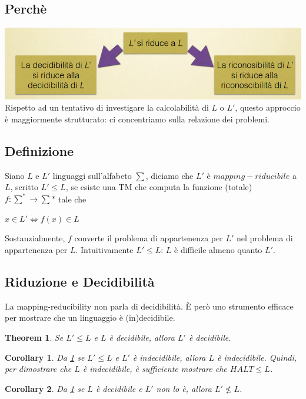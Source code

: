 \documentclass[a4paper, 12pt]{article}
\newtheorem{theorem}{Theorem}[section]
\newtheorem{corollary}{Corollary}[theorem]
\begin{document}
\subsection{Perch\`e}
\includegraphics[scale=0.5]{mapred1.png}\\
Rispetto ad un tentativo di investigare la calcolabilit\`a di $L$ o $L'$, questo approccio \`e maggiormente strutturato: ci concentriamo sulla relazione dei problemi.
\subsection{Definizione}
Siano $L$ e $L'$ linguaggi sull'alfabeto $\sum$, diciamo che $L'$ \`e $mapping-riducibile$ a $L$, scritto $L' \leq L$, se esiste una TM che computa la funzione (totale) $f: \sum^* \rightarrow \sum*$ tale che 
\begin{center}
$x \in L' \iff f(x) \in L$
\end{center}
Sostanzialmente, $f$ converte il problema di appartenenza per $L'$ nel problema di appartenenza per $L$. Intuitivamente $L' \leq L$: $L$ \`e difficile almeno quanto $L'$.
\subsection{Riduzione e Decidibilit\`a}
La mapping-reducibility non parla di decidibilit\`a. \`E per\`o uno strumento efficace per mostrare che un linguaggio \`e (in)decidibile.
\begin{theorem}
\label{th:4}
Se $L' \leq L$ e $L$ \`e decidibile, allora $L'$ \`e decidibile.
\end{theorem}
\begin{corollary}
Da \ref{th:4} se $L' \leq L$ e $L'$ \`e indecidibile, allora $L$ \`e indecidibile. Quindi, per dimostrare che $L$ \`e indecidibile, \`e sufficiente mostrare che $HALT \leq L$.
\end{corollary}
\begin{corollary}
Da \ref{th:4} se $L$ \`e decidibile e $L'$ non lo \`e, allora $L' \nleq L$.
\end{corollary}
\end{document}
